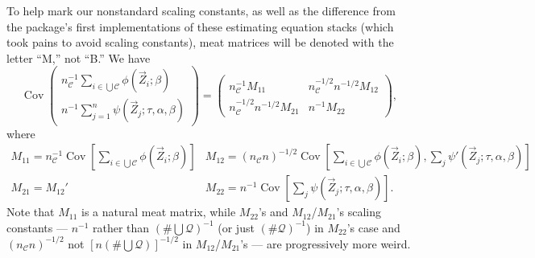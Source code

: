 \documentclass{article}
\begin{document}
To help mark our nonstandard scaling constants, as well as the difference from the package's first implementations of these estimating equation stacks (which took pains to avoid scaling constants), 
meat matrices will be denoted with the letter ``M,'' not ``B.''
We have
\[
\operatorname{Cov}\left(
     \begin{array}{c}
       n_{\mathcal{C}}^{-1}\sum_{i\in \bigcup \mathcal{C}}\phi(\vec{Z}_{i}; \beta )\\
       n^{-1}\sum_{j=1}^{n}\psi(\vec{Z}_{j}; \tau, \alpha, \beta )
     \end{array}
\right) = \left(
  \begin{array}{cc}
    n_{\mathcal{C}}^{-1}M_{11}& n_{\mathcal{C}}^{-1/2}n^{-1/2} M_{12}\\
    n_{\mathcal{C}}^{-1/2}n^{-1/2} M_{21} & n^{-1}M_{22}
  \end{array}
\right),
\]
where
\[
  \begin{array}{cc}
    M_{11}  = n_{\mathcal{C}}^{-1}\operatorname{Cov}[\sum_{i\in \bigcup
             \mathcal{C}} \phi(\vec{Z}_{i}; \beta )] &
                                                                  M_{12}=
                                                                  (n_{\mathcal{C}}n)^{-1/2} \operatorname{Cov}[\sum_{i\in \bigcup
             \mathcal{C}}\phi(\vec{Z}_{i};
                                                                  \beta
                                                                  ), \sum_{j}\psi'(\vec{Z}_{j}; \tau, \alpha, \beta )]\\
    M_{21}=M_{12}' & M_{22} = n^{-1}\operatorname{Cov}[\sum_{j}\psi(\vec{Z}_{j};
                     \tau, \alpha, \beta )] .
    \end{array}
\]
Note that $M_{11}$ is a natural meat matrix, while $M_{22}$'s and
$M_{12}$/$M_{21}$'s scaling constants --- $n^{-1}$ rather than $(\# \bigcup
\mathcal{Q})^{-1}$ (or just $(\# \mathcal{Q})^{-1}$) in $M_{22}$'s
case and $(n_{\mathcal{C}}n)^{-1/2}$ not $[n (\# \bigcup
\mathcal{Q})]^{-1/2}$ in $M_{12}$/$M_{21}$'s --- are progressively more weird.
\end{document}
